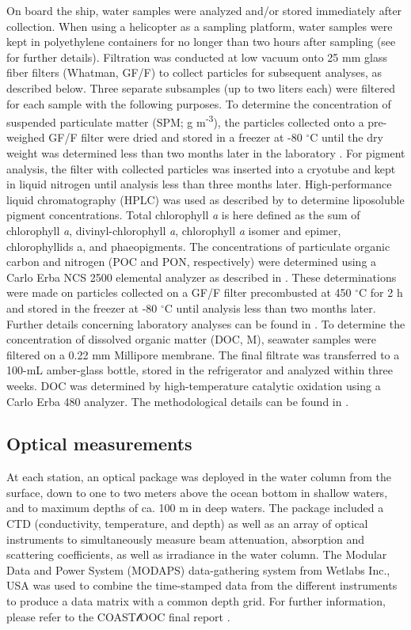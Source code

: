 \documentclass[essd, manuscript]{copernicus}
\begin{document}
On board the ship, water samples were analyzed and/or stored immediately after collection. When using a helicopter as a sampling platform, water samples were kept in polyethylene containers for no longer than two hours after sampling (see \citealt{Babin2003b} for further details). Filtration was conducted at low vacuum onto 25 mm glass fiber filters (Whatman, GF/F) to collect particles for subsequent analyses, as described below. Three separate subsamples (up to two liters each) were filtered for each sample with the following purposes. To determine the concentration of suspended particulate matter (SPM; g m\textsuperscript{-3}), the particles collected onto a pre-weighed GF/F filter were dried and stored in a freezer at -80 $^{\circ}$C until the dry weight was determined less than two months later in the laboratory \citep{VanDerLinde1998}. For pigment analysis, the filter with collected particles was inserted into a cryotube and kept in liquid nitrogen until analysis less than three months later. High-performance liquid chromatography (HPLC) was used as described by \citealt{Vidussi1996} to determine liposoluble pigment concentrations. Total chlorophyll \textit{a} is here defined as the sum of chlorophyll \textit{a}, divinyl-chlorophyll \textit{a}, chlorophyll \textit{a} isomer and epimer, chlorophyllids a, and phaeopigments. The concentrations of particulate organic carbon and nitrogen (POC and PON, respectively) were determined using a Carlo Erba NCS 2500 elemental analyzer as described in \citealt{Ferrari2003}. These determinations were made on particles collected on a GF/F filter precombusted at 450 $^{\circ}$C for 2 h and stored in the freezer at -80 $^{\circ}$C until analysis less than two months later. Further details concerning laboratory analyses can be found in \citealt{Babin2003b, Ferrari2000, Ferrari2003}. To determine the concentration of dissolved organic matter (DOC, M), seawater samples were filtered on a 0.22 mm Millipore membrane. The final filtrate was transferred to a 100-mL amber-glass bottle, stored in the refrigerator and analyzed within three weeks. DOC was determined by high-temperature catalytic oxidation using a Carlo Erba 480 analyzer. The methodological details can be found in \citealt{Ferrari2000}.

\subsection{Optical measurements}

At each station, an optical package was deployed in the water column from the surface, down to one to two meters above the ocean bottom in shallow waters, and to maximum depths of ca. 100 m in deep waters. The package included a CTD (conductivity, temperature, and depth) as well as an array of optical instruments to simultaneously measure beam attenuation, absorption and scattering coefficients, as well as irradiance in the water column. The Modular Data and Power System (MODAPS) data-gathering system from Wetlabs Inc., USA was used to combine the time-stamped data from the different instruments to produce a data matrix with a common depth grid. For further information, please refer to the COAST$\mathscr{l}$OOC final report \citep{Coastlooc2000}.
\end{document}
